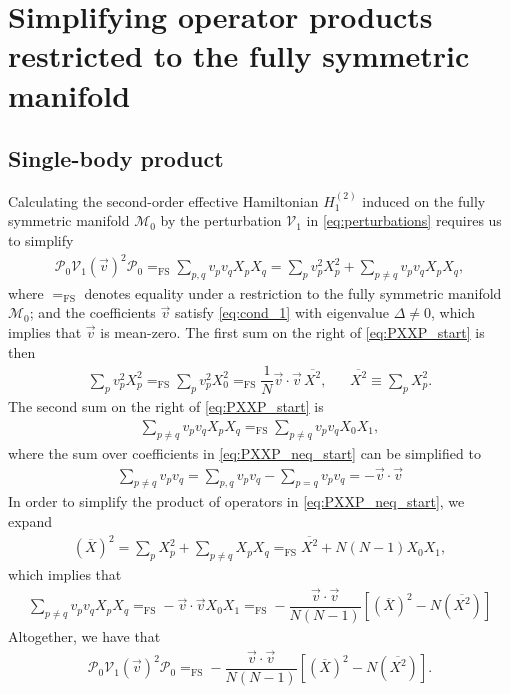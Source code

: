 \documentclass[nofootinbib,notitlepage,11pt]{revtex4-2}
\newcommand{\f}[2]{\dfrac{#1}{#2}} %
\newcommand{\p}[1]{\left(#1\right)} %
\renewcommand{\sp}[1]{\left[#1\right]} %
\renewcommand{\c}{\cdot} %
\renewcommand{\v}{\vec} %
\newcommand{\1}{\mathds{1}}
\newcommand{\M}{\mathcal{M}}
\renewcommand{\P}{\mathcal{P}}
\newcommand{\V}{\mathcal{V}}
\newcommand{\EQFS}{=_{\text{FS}}}
\newcommand{\col}{\overline}
\begin{document}
\section{Simplifying operator products restricted to the fully
  symmetric manifold}
\label{sec:sym_prod}

\subsection{Single-body product}
\label{sec:PXXP}

Calculating the second-order effective Hamiltonian $H_1^{(2)}$ induced
on the fully symmetric manifold $\M_0$ by the perturbation $\V_1$ in
\eqref{eq:perturbations} requires us to simplify
\begin{align}
  \P_0 \V_1\p{\v v}^2 \P_0
  \EQFS \sum_{p,q} v_p v_q X_p X_q
  = \sum_p v_p^2 X_p^2
  + \sum_{p\ne q} v_p v_q X_p X_q,
  \label{eq:PXXP_start}
\end{align}
where $\EQFS$ denotes equality under a restriction to the fully
symmetric manifold $\M_0$; and the coefficients $\v v$ satisfy
\eqref{eq:cond_1} with eigenvalue $\Delta\ne0$, which implies that
$\v v$ is mean-zero.  The first sum on the right of
\eqref{eq:PXXP_start} is then
\begin{align}
  \sum_p v_p^2 X_p^2
  \EQFS \sum_p v_p^2 X_0^2
  \EQFS \f1N \v v\c\v v\, \col{X^2},
  &&
  \col{X^2} \equiv \sum_p X_p^2.
  \label{eq:PXXP_eq}
\end{align}
The second sum on the right of \eqref{eq:PXXP_start} is
\begin{align}
  \sum_{p\ne q} v_p v_q X_p X_q
  \EQFS \sum_{p\ne q} v_p v_q X_0 X_1,
  \label{eq:PXXP_neq_start}
\end{align}
where the sum over coefficients in \eqref{eq:PXXP_neq_start} can be
simplified to
\begin{align}
  \sum_{p\ne q} v_p v_q
  = \sum_{p,q} v_p v_q - \sum_{p=q} v_p v_q
  = - \v v\c\v v
\end{align}
In order to simplify the product of operators in
\eqref{eq:PXXP_neq_start}, we expand
\begin{align}
  \p{\col{X}}^2
  = \sum_p X_p^2 + \sum_{p\ne q} X_p X_q
  \EQFS \col{X^2} + N \p{N-1} X_0 X_1,
  \label{eq:PXXP_neq_ops}
\end{align}
which implies that
\begin{align}
  \sum_{p\ne q} v_p v_q X_p X_q
  \EQFS - \v v\c\v v X_0 X_1
  \EQFS -\f{\v v\c\v v}{N\p{N-1}}
  \sp{\p{\col{X}}^2 - N \p{\col{X^2}}}
  \label{eq:PXXP_neq}
\end{align}
Altogether, we have that
\begin{align}
  \P_0 \V_1\p{\v v}^2 \P_0
  \EQFS -\f{\v v\c\v v}{N\p{N-1}}
  \sp{\p{\col{X}}^2 - N \p{\col{X^2}}}.
\end{align}
\end{document}
